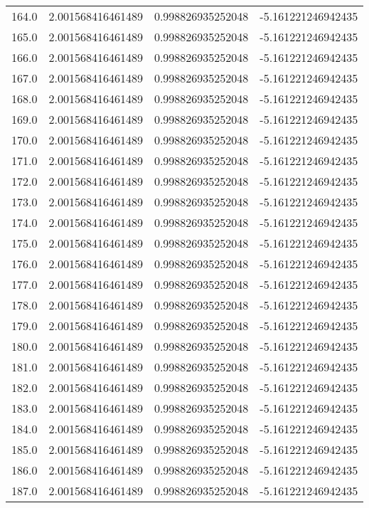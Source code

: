 \begin{longtable}{lrrr}
164.0 & 2.001568416461489 & 0.998826935252048 & -5.161221246942435 \\
165.0 & 2.001568416461489 & 0.998826935252048 & -5.161221246942435 \\
166.0 & 2.001568416461489 & 0.998826935252048 & -5.161221246942435 \\
167.0 & 2.001568416461489 & 0.998826935252048 & -5.161221246942435 \\
168.0 & 2.001568416461489 & 0.998826935252048 & -5.161221246942435 \\
169.0 & 2.001568416461489 & 0.998826935252048 & -5.161221246942435 \\
170.0 & 2.001568416461489 & 0.998826935252048 & -5.161221246942435 \\
171.0 & 2.001568416461489 & 0.998826935252048 & -5.161221246942435 \\
172.0 & 2.001568416461489 & 0.998826935252048 & -5.161221246942435 \\
173.0 & 2.001568416461489 & 0.998826935252048 & -5.161221246942435 \\
174.0 & 2.001568416461489 & 0.998826935252048 & -5.161221246942435 \\
175.0 & 2.001568416461489 & 0.998826935252048 & -5.161221246942435 \\
176.0 & 2.001568416461489 & 0.998826935252048 & -5.161221246942435 \\
177.0 & 2.001568416461489 & 0.998826935252048 & -5.161221246942435 \\
178.0 & 2.001568416461489 & 0.998826935252048 & -5.161221246942435 \\
179.0 & 2.001568416461489 & 0.998826935252048 & -5.161221246942435 \\
180.0 & 2.001568416461489 & 0.998826935252048 & -5.161221246942435 \\
181.0 & 2.001568416461489 & 0.998826935252048 & -5.161221246942435 \\
182.0 & 2.001568416461489 & 0.998826935252048 & -5.161221246942435 \\
183.0 & 2.001568416461489 & 0.998826935252048 & -5.161221246942435 \\
184.0 & 2.001568416461489 & 0.998826935252048 & -5.161221246942435 \\
185.0 & 2.001568416461489 & 0.998826935252048 & -5.161221246942435 \\
186.0 & 2.001568416461489 & 0.998826935252048 & -5.161221246942435 \\
187.0 & 2.001568416461489 & 0.998826935252048 & -5.161221246942435 \\

\end{longtable}
